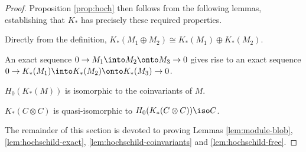 \begin{proof}
%

Proposition \ref{prop:hoch} then follows from the following lemmas, establishing that $K_*$ has precisely these required properties.
\begin{lem}
\label{lem:hochschild-additive}%
Directly from the definition, $K_*(M_1 \oplus M_2) \cong K_*(M_1) \oplus K_*(M_2)$.
\end{lem}
\begin{lem}
\label{lem:hochschild-exact}%
An exact sequence $0 \to M_1 \into M_2 \onto M_3 \to 0$ gives rise to an
exact sequence $0 \to K_*(M_1) \into K_*(M_2) \onto K_*(M_3) \to 0$.
\end{lem}
\begin{lem}
\label{lem:hochschild-coinvariants}%
$H_0(K_*(M))$ is isomorphic to the coinvariants of $M$.
\end{lem}
\begin{lem}
\label{lem:hochschild-free}%
$K_*(C\otimes C)$ is quasi-isomorphic to $H_0(K_*(C \otimes C)) \iso C$.
\end{lem}

The remainder of this section is devoted to proving Lemmas
\ref{lem:module-blob},
\ref{lem:hochschild-exact}, \ref{lem:hochschild-coinvariants} and
\ref{lem:hochschild-free}.
\end{proof}

